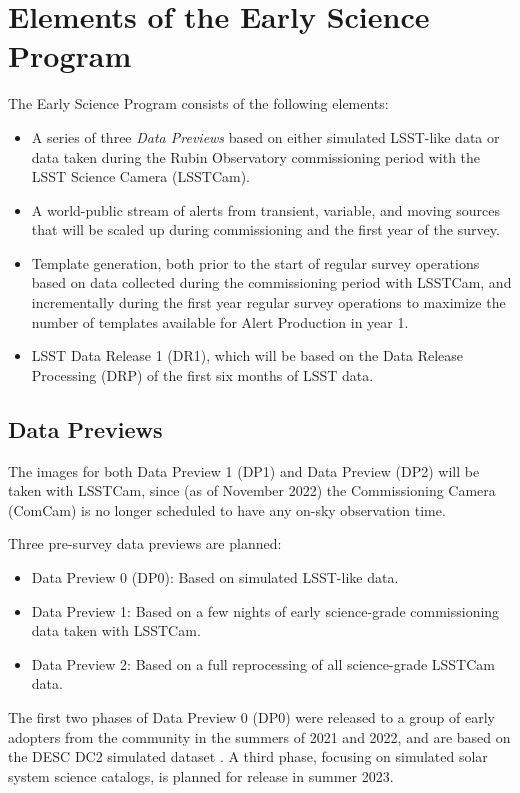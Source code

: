 \section{Elements of the Early Science Program}

The Early Science Program consists of the following elements:
\begin{itemize}
	\item A series of three \emph{Data Previews} based on either simulated LSST-like data or data taken during the Rubin Observatory commissioning period with the LSST Science Camera (LSSTCam).
	\item A world-public stream of alerts from transient, variable, and moving sources that will be scaled up during commissioning and the first year of the survey.
	\item Template generation, both prior to the start of regular survey operations based on data collected during the commissioning period with LSSTCam, and incrementally during the first year regular survey operations  to maximize the number of templates available for Alert Production in year 1.
	\item LSST Data Release 1 (DR1), which will be based on the Data Release Processing (DRP) of the first six months of LSST data.
\end{itemize}

\subsection{Data Previews}

The images for both Data Preview 1 (DP1) and Data Preview (DP2) will be taken with LSSTCam, since (as of November 2022) the Commissioning Camera (ComCam) is no longer scheduled to have any on-sky observation time.

Three pre-survey data previews are planned:
\begin{itemize}
\item  Data Preview 0 (DP0): Based on simulated LSST-like data.
\item  Data Preview 1: Based on a few nights of early science-grade commissioning data taken with LSSTCam.
\item Data Preview 2: Based on a full reprocessing of all science-grade LSSTCam data.

\end{itemize}

The first two phases of Data Preview 0 (DP0) were released to a group of early adopters from the community in the summers of 2021 and 2022, and are based on the DESC DC2 simulated dataset \citep{2021ApJS..253...31L}.
A third phase, focusing on simulated solar system science catalogs, is planned for release in summer 2023.

